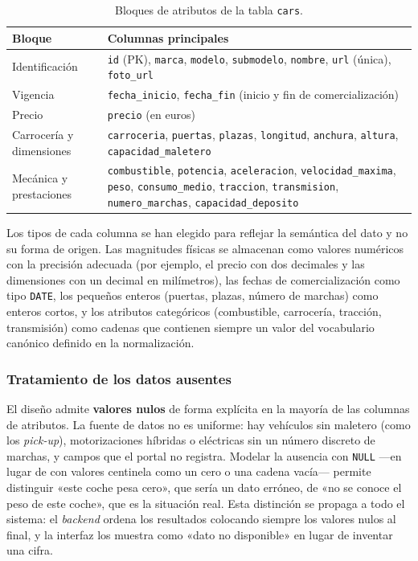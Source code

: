 \begin{table}[H]
\centering
\begin{tabular}{p{3.2cm}p{9.5cm}}
\hline
\textbf{Bloque} & \textbf{Columnas principales} \\
\hline
Identificación &
\texttt{id} (PK), \texttt{marca}, \texttt{modelo}, \texttt{submodelo},
\texttt{nombre}, \texttt{url} (única), \texttt{foto\_url} \\
\hline
Vigencia &
\texttt{fecha\_inicio}, \texttt{fecha\_fin} (inicio y fin de comercialización) \\
\hline
Precio &
\texttt{precio} (en euros) \\
\hline
Carrocería y \mbox{dimensiones} &
\texttt{carroceria}, \texttt{puertas}, \texttt{plazas}, \texttt{longitud},
\texttt{anchura}, \texttt{altura}, \texttt{capacidad\_maletero} \\
\hline
Mecánica y \mbox{prestaciones} &
\texttt{combustible}, \texttt{potencia}, \texttt{aceleracion},
\texttt{velocidad\_maxima}, \texttt{peso}, \texttt{consumo\_medio},
\texttt{traccion}, \texttt{transmision}, \texttt{numero\_marchas},
\texttt{capacidad\_deposito} \\
\hline
\end{tabular}
\caption{Bloques de atributos de la tabla \texttt{cars}.}
\label{tab:esquema-cars}
\end{table}

Los tipos de cada columna se han elegido para reflejar la semántica del dato y
no su forma de origen. Las magnitudes físicas se almacenan como valores
numéricos con la precisión adecuada (por ejemplo, el precio con dos decimales y
las dimensiones con un decimal en milímetros), las fechas de comercialización
como tipo \texttt{DATE}, los pequeños enteros (puertas, plazas, número de
marchas) como enteros cortos, y los atributos categóricos (combustible,
carrocería, tracción, transmisión) como cadenas que contienen siempre un valor
del vocabulario canónico definido en la normalización.

\subsubsection*{Tratamiento de los datos ausentes}

El diseño admite \textbf{valores nulos} de forma explícita en la mayoría de las
columnas de atributos. La fuente de datos no es uniforme: hay vehículos sin
maletero (como los \emph{pick-up}), motorizaciones híbridas o eléctricas sin un
número discreto de marchas, y campos que el portal no registra. Modelar la
ausencia con \texttt{NULL} —en lugar de con valores centinela como un cero o una
cadena vacía— permite distinguir «este coche pesa cero», que sería un dato
erróneo, de «no se conoce el peso de este coche», que es la situación real. Esta
distinción se propaga a todo el sistema: el \emph{backend} ordena los resultados
colocando siempre los valores nulos al final, y la interfaz los muestra como
«dato no disponible» en lugar de inventar una cifra.


